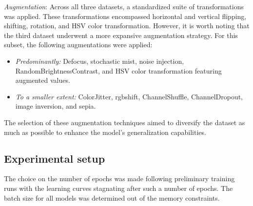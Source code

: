 \begin{description}
\textit{Augmentation}: Across all three datasets, a standardized suite of transformations was applied.
These transformations encompassed horizontal and vertical flipping, shifting, rotation, and HSV color transformation.
However, it is worth noting that the third dataset underwent a more expansive augmentation strategy.
For this subset, the following augmentations were applied:
\begin{itemize}
    \item \textit{Predominantly:} Defocus, stochastic mist, noise injection, RandomBrightnessContrast, and HSV color transformation featuring augmented values.
    \item \textit{To a smaller extent:} ColorJitter, rgbshift, ChannelShuffle, ChannelDropout, image inversion, and sepia.
\end{itemize}
The selection of these augmentation techniques aimed to diversify the dataset as much as possible to enhance the model's generalization capabilities.
\subsection {Experimental setup}


The choice on the number of epochs was made following preliminary training runs with the learning curves stagnating after such a number of epochs.
The batch size for all models was determined out of the memory constraints.


\end{description}
